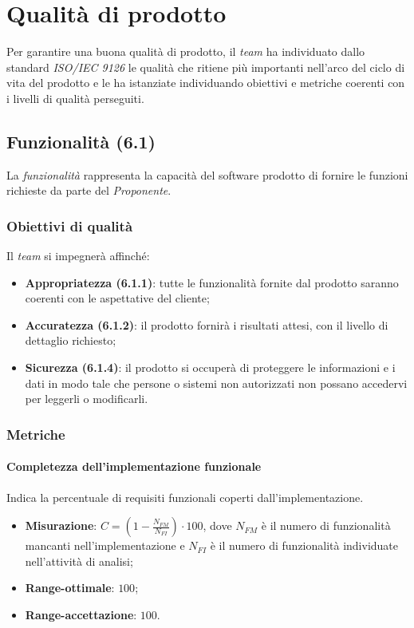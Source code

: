 \newpage
\section{Qualità di prodotto}
Per garantire una buona qualità di prodotto, il \textit{team} ha individuato dallo standard \textit{ISO/IEC 9126} le qualità che ritiene più importanti nell'arco del ciclo di vita del prodotto e le ha istanziate individuando obiettivi e metriche coerenti con i livelli di qualità perseguiti.


\subsection{Funzionalità (6.1)}
La \textit{funzionalità} rappresenta la capacità del software prodotto di fornire le funzioni richieste da parte del \textit{Proponente}.

\subsubsection{Obiettivi di qualità}
Il \textit{team} si impegnerà affinché:
\begin{itemize}
\item \textbf{Appropriatezza (6.1.1)}: tutte le funzionalità fornite dal prodotto saranno coerenti con le aspettative del cliente;
\item \textbf{Accuratezza (6.1.2)}: il prodotto fornirà i risultati attesi, con il livello di dettaglio richiesto;
\item \textbf{Sicurezza (6.1.4)}: il prodotto si occuperà di proteggere le informazioni e i dati in modo tale che persone o sistemi non autorizzati non possano accedervi per leggerli o modificarli.
\end{itemize}
\subsubsection{Metriche}
\paragraph{Completezza dell'implementazione funzionale}
Indica la percentuale di requisiti funzionali coperti dall'implementazione.
\begin{itemize}
\item \textbf{Misurazione}: $C=(1-\frac{N_{FM}}{N_{FI}}) \cdot 100$, dove $N_{FM}$ è il numero di funzionalità mancanti nell'implementazione e $N_{FI}$ è il numero di funzionalità individuate nell'attività di analisi;
\item \textbf{Range-ottimale}: $100$;
\item \textbf{Range-accettazione}: $100$.
\end{itemize}
